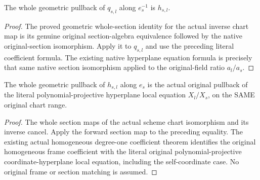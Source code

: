 \begin{lemma}
\label{lem:seven-original-native-hyperplane-inverse-pullback-route}
\leanok
{}
The whole geometric pullback of $q_{s,l}$ along $e_s^{-1}$ is $h_{s,l}$.
\end{lemma}
\begin{proof}
The proved geometric whole-section identity for the actual inverse chart
map is its genuine original section-algebra equivalence followed by the
native original-section isomorphism. Apply it to $q_{s,l}$ and use the
preceding literal coefficient formula. The existing native hyperplane
equation formula is precisely that same native section isomorphism applied
to the original-field ratio $a_l/a_s$.
\end{proof}

\begin{lemma}
\label{lem:seven-original-native-hyperplane-forward-pullback-route}
\leanok
{}
The whole geometric pullback of $h_{s,l}$ along $e_s$ is the actual original
pullback of the literal polynomial-projective hyperplane local equation
$X_l/X_s$, on the SAME original chart range.
\end{lemma}
\begin{proof}
The whole section maps of the actual scheme chart isomorphism and its
inverse cancel. Apply the forward section map to the preceding equality.
The existing actual homogeneous degree-one coefficient theorem identifies
the original homogeneous frame coefficient with the literal original
polynomial-projective coordinate-hyperplane local equation, including the
self-coordinate case. No original frame or section matching is assumed.
\end{proof}

